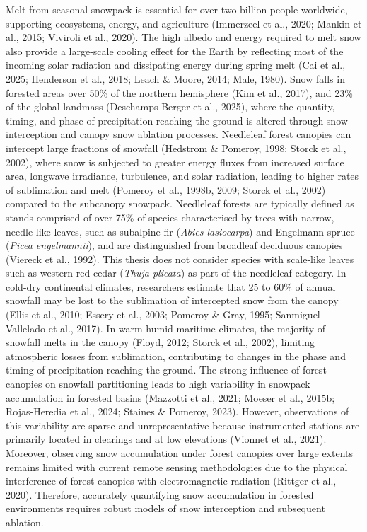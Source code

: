 \documentclass[
  letterpaper,
]{tex/uofsthesis-cs}
\begin{document}
Melt from seasonal snowpack is essential for over two billion people
worldwide, supporting ecosystems, energy, and agriculture (Immerzeel et
al., 2020; Mankin et al., 2015; Viviroli et al., 2020). The high albedo
and energy required to melt snow also provide a large-scale cooling
effect for the Earth by reflecting most of the incoming solar radiation
and dissipating energy during spring melt (Cai et al., 2025; Henderson
et al., 2018; Leach \& Moore, 2014; Male, 1980). Snow falls in forested
areas over 50\% of the northern hemisphere (Kim et al., 2017), and 23\%
of the global landmass (Deschamps-Berger et al., 2025), where the
quantity, timing, and phase of precipitation reaching the ground is
altered through snow interception and canopy snow ablation processes.
Needleleaf forest canopies can intercept large fractions of snowfall
(Hedstrom \& Pomeroy, 1998; Storck et al., 2002), where snow is
subjected to greater energy fluxes from increased surface area, longwave
irradiance, turbulence, and solar radiation, leading to higher rates of
sublimation and melt (Pomeroy et al., 1998b, 2009; Storck et al., 2002)
compared to the subcanopy snowpack. Needleleaf forests are typically
defined as stands comprised of over 75\% of species characterised by
trees with narrow, needle-like leaves, such as subalpine fir
(\emph{Abies lasiocarpa}) and Engelmann spruce (\emph{Picea
engelmannii}), and are distinguished from broadleaf deciduous canopies
(Viereck et al., 1992). This thesis does not consider species with
scale-like leaves such as western red cedar (\emph{Thuja plicata}) as
part of the needleleaf category. In cold-dry continental climates,
researchers estimate that 25 to 60\% of annual snowfall may be lost to
the sublimation of intercepted snow from the canopy (Ellis et al., 2010;
Essery et al., 2003; Pomeroy \& Gray, 1995; Sanmiguel-Vallelado et al.,
2017). In warm-humid maritime climates, the majority of snowfall melts
in the canopy (Floyd, 2012; Storck et al., 2002), limiting atmospheric
losses from sublimation, contributing to changes in the phase and timing
of precipitation reaching the ground. The strong influence of forest
canopies on snowfall partitioning leads to high variability in snowpack
accumulation in forested basins (Mazzotti et al., 2021; Moeser et al.,
2015b; Rojas-Heredia et al., 2024; Staines \& Pomeroy, 2023). However,
observations of this variability are sparse and unrepresentative because
instrumented stations are primarily located in clearings and at low
elevations (Vionnet et al., 2021). Moreover, observing snow accumulation
under forest canopies over large extents remains limited with current
remote sensing methodologies due to the physical interference of forest
canopies with electromagnetic radiation (Rittger et al., 2020).
Therefore, accurately quantifying snow accumulation in forested
environments requires robust models of snow interception and subsequent
ablation.
\end{document}
